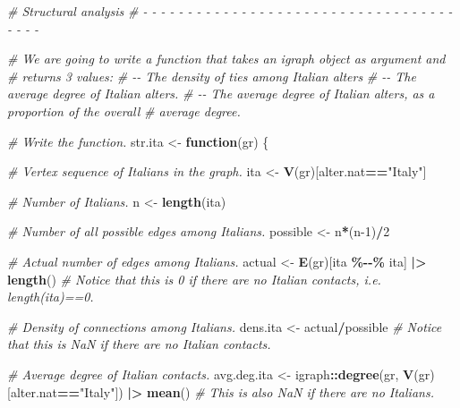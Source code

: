 \documentclass[
]{book}
\newenvironment{Shaded}{\begin{snugshade}}{\end{snugshade}}
\newcommand{\CommentTok}[1]{\textcolor[rgb]{0.56,0.35,0.01}{\textit{#1}}}
\newcommand{\ControlFlowTok}[1]{\textcolor[rgb]{0.13,0.29,0.53}{\textbf{#1}}}
\newcommand{\DecValTok}[1]{\textcolor[rgb]{0.00,0.00,0.81}{#1}}
\newcommand{\FunctionTok}[1]{\textcolor[rgb]{0.13,0.29,0.53}{\textbf{#1}}}
\newcommand{\NormalTok}[1]{#1}
\newcommand{\OtherTok}[1]{\textcolor[rgb]{0.56,0.35,0.01}{#1}}
\newcommand{\SpecialCharTok}[1]{\textcolor[rgb]{0.81,0.36,0.00}{\textbf{#1}}}
\newcommand{\StringTok}[1]{\textcolor[rgb]{0.31,0.60,0.02}{#1}}
\begin{document}
\begin{Shaded}
\begin{Highlighting}[]
\CommentTok{\# Structural analysis}
\CommentTok{\# {-} {-} {-} {-} {-} {-} {-} {-} {-} {-} {-} {-} {-} {-} {-} {-} {-} {-} {-} {-} {-} {-} {-} {-} {-} {-} {-} {-} {-} {-} {-} {-} {-} {-} {-} {-} {-} {-} {-} }

\CommentTok{\# We are going to write a function that takes an igraph object as argument and }
\CommentTok{\# returns 3 values:}
\CommentTok{\# {-}{-} The density of ties among Italian alters}
\CommentTok{\# {-}{-} The average degree of Italian alters.}
\CommentTok{\# {-}{-} The average degree of Italian alters, as a proportion of the overall}
\CommentTok{\# average degree.}

\CommentTok{\# Write the function.}
\NormalTok{str.ita }\OtherTok{\textless{}{-}} \ControlFlowTok{function}\NormalTok{(gr) \{}
  
  \CommentTok{\# Vertex sequence of Italians in the graph.}
\NormalTok{  ita }\OtherTok{\textless{}{-}} \FunctionTok{V}\NormalTok{(gr)[alter.nat}\SpecialCharTok{==}\StringTok{"Italy"}\NormalTok{]}
  
  \CommentTok{\# Number of Italians.}
\NormalTok{  n }\OtherTok{\textless{}{-}} \FunctionTok{length}\NormalTok{(ita)}
  
  \CommentTok{\# Number of all possible edges among Italians.}
\NormalTok{  possible }\OtherTok{\textless{}{-}}\NormalTok{ n}\SpecialCharTok{*}\NormalTok{(n}\DecValTok{{-}1}\NormalTok{)}\SpecialCharTok{/}\DecValTok{2}
  
  \CommentTok{\# Actual number of edges among Italians.}
\NormalTok{  actual }\OtherTok{\textless{}{-}} \FunctionTok{E}\NormalTok{(gr)[ita }\SpecialCharTok{\%{-}{-}\%}\NormalTok{ ita] }\SpecialCharTok{|\textgreater{}} \FunctionTok{length}\NormalTok{()}
  \CommentTok{\# Notice that this is 0 if there are no Italian contacts, i.e. length(ita)==0.}
  
  \CommentTok{\# Density of connections among Italians.}
\NormalTok{  dens.ita }\OtherTok{\textless{}{-}}\NormalTok{ actual}\SpecialCharTok{/}\NormalTok{possible}
  \CommentTok{\# Notice that this is NaN if there are no Italian contacts.}
  
  \CommentTok{\# Average degree of Italian contacts.}
\NormalTok{  avg.deg.ita }\OtherTok{\textless{}{-}}\NormalTok{ igraph}\SpecialCharTok{::}\FunctionTok{degree}\NormalTok{(gr, }\FunctionTok{V}\NormalTok{(gr)[alter.nat}\SpecialCharTok{==}\StringTok{"Italy"}\NormalTok{]) }\SpecialCharTok{|\textgreater{}} \FunctionTok{mean}\NormalTok{()}
  \CommentTok{\# This is also NaN if there are no Italians.}
  

\end{Highlighting}
\end{Shaded}
\end{document}
